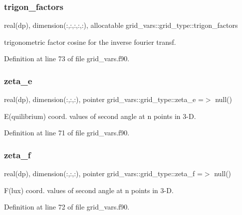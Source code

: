 \subsubsection{\texorpdfstring{trigon\+\_\+factors}{trigon\_factors}}
{\footnotesize\ttfamily real(dp), dimension(\+:,\+:,\+:,\+:,\+:), allocatable grid\+\_\+vars\+::grid\+\_\+type\+::trigon\+\_\+factors}



trigonometric factor cosine for the inverse fourier transf. 



Definition at line 73 of file grid\+\_\+vars.\+f90.

\mbox{\label{structgrid__vars_1_1grid__type_a0d866f4fcf46ea05611089afa76cbea0}} 
\subsubsection{\texorpdfstring{zeta\+\_\+e}{zeta\_e}}
{\footnotesize\ttfamily real(dp), dimension(\+:,\+:,\+:), pointer grid\+\_\+vars\+::grid\+\_\+type\+::zeta\+\_\+e =$>$ null()}



E(quilibrium) coord. values of second angle at n points in 3-\/D. 



Definition at line 71 of file grid\+\_\+vars.\+f90.

\mbox{\label{structgrid__vars_1_1grid__type_a839dff9cce6047247918fd47a87ef1fc}} 
\subsubsection{\texorpdfstring{zeta\+\_\+f}{zeta\_f}}
{\footnotesize\ttfamily real(dp), dimension(\+:,\+:,\+:), pointer grid\+\_\+vars\+::grid\+\_\+type\+::zeta\+\_\+f =$>$ null()}



F(lux) coord. values of second angle at n points in 3-\/D. 



Definition at line 72 of file grid\+\_\+vars.\+f90.



